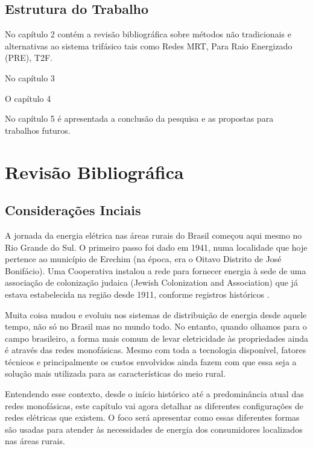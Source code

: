 \documentclass[oneside,openright,12pt]{ufsm_2021} %
\begin{document}
\section{Estrutura do Trabalho}

\par No capítulo 2 contém a revisão bibliográfica sobre métodos não tradicionais e alternativas ao sistema trifásico tais como Redes MRT, Para Raio Energizado (PRE), T2F.
\par No capítulo 3 
\par O capítulo 4
\par No capítulo 5 é apresentada a conclusão da pesquisa e as propostas para trabalhos futuros.

\chapter{Revisão Bibliográfica}

\section{Considerações Inciais}

\par A jornada da energia elétrica nas áreas rurais do Brasil começou aqui mesmo no Rio Grande do Sul. O primeiro passo foi dado em 1941, numa localidade que hoje pertence ao município de Erechim (na época, era o Oitavo Distrito de José Bonifácio). Uma Cooperativa instalou a rede para fornecer energia à sede de uma associação de colonização judaica (Jewish Colonization and Association) que já estava estabelecida na região desde 1911, conforme registros históricos \cite{fecoergs_historia_2016}.

\par Muita coisa mudou e evoluiu nos sistemas de distribuição de energia desde aquele tempo, não só no Brasil mas no mundo todo. No entanto, quando olhamos para o campo brasileiro, a forma mais comum de levar eletricidade às propriedades ainda é através das redes monofásicas. Mesmo com toda a tecnologia disponível, fatores técnicos e principalmente os custos envolvidos ainda fazem com que essa seja a solução mais utilizada para as características do meio rural.

\par Entendendo esse contexto, desde o início histórico até a predominância atual das redes monofásicas, este capítulo vai agora detalhar as diferentes configurações de redes elétricas que existem. O foco será apresentar como essas diferentes formas são usadas para atender às necessidades de energia dos consumidores localizados nas áreas rurais.
\end{document}
